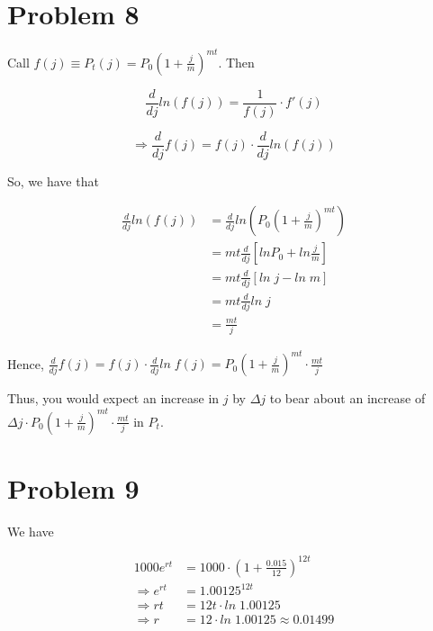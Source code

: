 \documentclass[12pt]{article}
\begin{document}
\section*{Problem 8}
Call $f(j) \equiv P_t(j) = P_0(1+\frac{j}{m})^{mt}$. Then 

\newcommand{\dv}[1]{\frac{d}{d#1}}

$$\dv j ln(f(j))=\frac{1}{f(j)}\cdot f'(j)$$

$$\Rightarrow \dv j f(j) = f(j)\cdot \dv{j}ln(f(j))$$

So, we have that

\begin{align*}
\dv j ln(f(j)) &= \dv j ln(P_0(1+\frac{j}{m})^{mt}) \\
	&= mt \dv j [ln P_0 + ln\frac{j}{m}] \\
	&= mt\dv j[ln\; j - ln\; m]\\
	&= mt\dv j ln\; j\\
	&= \frac{mt}{j}
\end{align*}

Hence, $\dv j f(j) = f(j)\cdot \dv j ln\; f(j) = P_0(1+\frac{j}{m})^{mt}\cdot \frac{mt}{j}$

Thus, you would expect an increase in $j$ by $\Delta j$ to
bear about an increase of $\Delta j\cdot P_0(1+\frac{j}{m})^{mt}\cdot \frac{mt}{j}$ in $P_t$.

\section*{Problem 9}
We have

\begin{align*}
1000e^{rt} &= 1000\cdot(1+\frac{0.015}{12})^{12t} \\
\Rightarrow e^{rt} &= 1.00125^{12t} \\
\Rightarrow rt &= 12t\cdot ln\; 1.00125 \\
\Rightarrow r &= 12\cdot ln\;1.00125\approx 0.01499
\end{align*}
\end{document}
